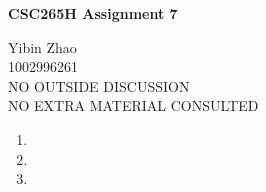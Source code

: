 \documentclass[10pt]{article}
\begin{document}
\begin{center}
{\bf \Large \bf CSC265H Assignment 7}
\end{center}

\noindent
Yibin Zhao\\
1002996261\\
NO OUTSIDE DISCUSSION\\
NO EXTRA MATERIAL CONSULTED\\

\begin{comment}
	Consider the DISJOINT SET data sturcture that represents each set by a tree, 
	preform LINK(x, y) by making y a child of x, and use path compression during FIND-SET.

	For any node x, let w(x) denote the number of nodes in the subtree rooted at x.
\end{comment}

\begin{enumerate}

	\begin{comment}
	Prove that, if n MAKE-SET operations and any number of LINK and FIND-SET operations have 
	been performed, then any node has at most $\log_2(n)$ ancestor v, such that $w(parent(v)) \geq 2w(v)$.
	\end{comment}
	\item

	\begin{comment}
	Using the accounting method, prove that the amartized complexity of MAKE-SET is $O(1)$ and the amartized
	complexity of LINK and FIND-SET are $O(\log(n))$, where $n$ is the number of MAKE-SET operations performed.

	Consider the following credit invariant: Each node $x$ has $\log_2(w(x))$ credits associated with it. 
	\end{comment}
	\item

	\begin{comment}
	Using the potential method, prove that the amartized complexity of MAKE-SET is $O(1)$
	and the amartized complexity of LINK and FIND-SET are $O(\log(n))$, where $n$ is the number of
	MAKE-SET operations that have been performed.
	\end{comment}
	\item

\end{enumerate}
\end{document}
